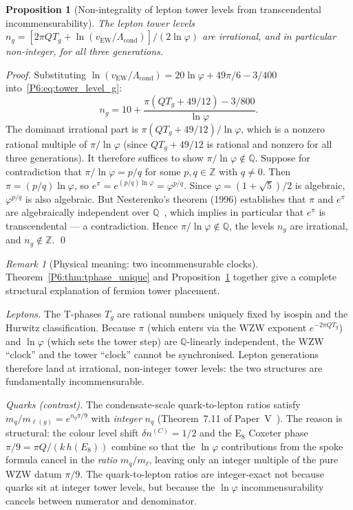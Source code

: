 \documentclass[11pt,a4paper]{article}
\newtheorem{proposition}[theorem]{Proposition}
\theoremstyle{definition}
\theoremstyle{remark}
\newtheorem{remark}[theorem]{Remark}
\newcommand{\vp}{\varphi}
\newcommand{\vEW}{v_{\mathrm{EW}}}
\newcommand{\Lcond}{\Lambda_{\mathrm{cond}}}
\begin{document}
\begin{proposition}[Non-integrality of lepton tower levels from
                    transcendental incommensurability]
\label{P6:prop:noninteger}
The lepton tower levels $n_g = [2\pi Q T_g + \ln(\vEW/\Lcond)]/(2\ln\vp)$
are irrational, and in particular non-integer, for all three generations.
\end{proposition}

\begin{proof}
Substituting $\ln(\vEW/\Lcond) = 20\ln\vp + 49\pi/6 - 3/400$
into~\eqref{P6:eq:tower_level_g}:
\begin{equation}
  n_g = 10 + \frac{\pi(Q T_g + 49/12) - 3/800}{\ln\vp}.
  \label{P6:eq:ng_expanded}
\end{equation}
The dominant irrational part is $\pi(QT_g + 49/12)/\ln\vp$, which is a
nonzero rational multiple of $\pi/\ln\vp$ (since $QT_g + 49/12$ is
rational and nonzero for all three generations).
It therefore suffices to show $\pi/\ln\vp \notin \mathbb{Q}$.
Suppose for contradiction that $\pi/\ln\vp = p/q$ for some $p,q\in\mathbb{Z}$
with $q\neq0$.  Then $\pi = (p/q)\ln\vp$, so
$e^\pi = e^{(p/q)\ln\vp} = \vp^{p/q}$.
Since $\vp=(1+\sqrt{5})/2$ is algebraic, $\vp^{p/q}$ is also algebraic.
But Nesterenko's theorem (1996) establishes that $\pi$ and $e^\pi$ are
algebraically independent over $\mathbb{Q}$~\cite{Nesterenko1996},
which implies in particular that $e^\pi$ is transcendental ---
a contradiction.  Hence $\pi/\ln\vp\notin\mathbb{Q}$, the levels $n_g$
are irrational, and $n_g\notin\mathbb{Z}$.
\qed
\end{proof}

\begin{remark}[Physical meaning: two incommensurable clocks]
\label{P6:rem:incommensurability}
Theorem~\ref{P6:thm:tphase_unique} and Proposition~\ref{P6:prop:noninteger}
together give a complete structural explanation of fermion tower placement.

\emph{Leptons.}
The T-phases $T_g$ are rational numbers uniquely fixed by isospin and
the Hurwitz classification.
Because $\pi$ (which enters via the WZW exponent $e^{-2\pi Q T_g}$) and
$\ln\vp$ (which sets the tower step) are $\mathbb{Q}$-linearly independent,
the WZW ``clock'' and the tower ``clock'' cannot be synchronised.
Lepton generations therefore land at irrational, non-integer tower levels:
the two structures are fundamentally incommensurable.

\emph{Quarks (contrast).}
The condensate-scale quark-to-lepton ratios satisfy
$m_q/m_{\ell(g)} = e^{n_q\pi/9}$ with \emph{integer} $n_q$
(Theorem~7.11 of Paper~V~\cite{Paper5}).
The reason is structural: the colour level shift $\delta n^{(C)}=1/2$
and the E$_8$ Coxeter phase $\pi/9 = \pi Q/(k\,h(E_8))$ combine so
that the $\ln\vp$ contributions from the spoke formula cancel in the
\emph{ratio} $m_q/m_\ell$, leaving only an integer multiple of the
pure WZW datum $\pi/9$.
The quark-to-lepton ratios are integer-exact not because quarks sit at
integer tower levels, but because the $\ln\vp$ incommensurability
cancels between numerator and denominator.
\end{remark}
\end{document}
